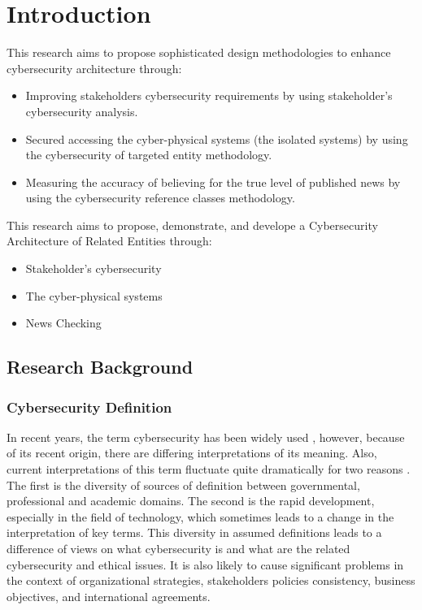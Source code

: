 \chapter{Introduction}

\if 
This research aims to propose sophisticated design methodologies to enhance cybersecurity architecture through:
\begin{itemize}
\item Improving stakeholders cybersecurity requirements by using stakeholder's cybersecurity analysis.
\item Secured accessing
the cyber-physical systems (the isolated systems) by using the cybersecurity of targeted entity methodology.
\item Measuring the accuracy of believing for the true level of published news by using the cybersecurity reference classes methodology. 
\end{itemize} \fi
\if
This research aims to propose,  demonstrate, and develope a Cybersecurity Architecture of Related Entities through:
\begin{itemize}
\item Stakeholder's cybersecurity  %
\item  The cyber-physical systems %
\item  News Checking %
\end{itemize}
\fi


\section{Research Background}
\subsection{Cybersecurity Definition}
In recent years, the term cybersecurity has been widely used \cite{craigen2014defining,schatz2017towards,giles2013divided}, however, because of its recent origin, there are differing interpretations of its meaning. Also, current interpretations of this term fluctuate quite dramatically for two reasons \cite{schatz2017towards}. The first is the diversity of sources of definition between governmental, professional and academic domains. The second  is the rapid development, especially in the field of technology, which sometimes leads to a change in the interpretation of key terms. This diversity in assumed definitions leads to a difference of views on what cybersecurity is and what are the related cybersecurity and ethical issues. It is also likely to cause significant problems in the context of organizational strategies, stakeholders policies consistency, business objectives, and international agreements. 

